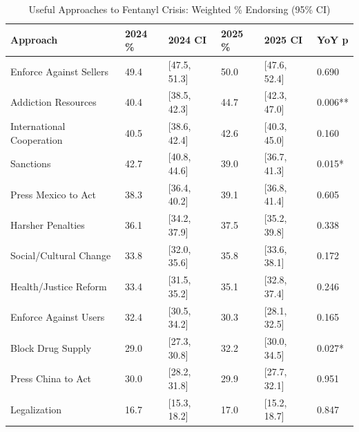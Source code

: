 \begin{table}[!h]
\centering
\caption{Useful Approaches to Fentanyl Crisis: Weighted \% Endorsing (95\% CI)}
\centering
\begin{tabular}[t]{llllll}
\toprule
Approach & 2024 \% & 2024 CI & 2025 \% & 2025 CI & YoY p\\
\midrule
Enforce Against Sellers & 49.4 & {}[47.5, 51.3] & 50.0 & {}[47.6, 52.4] & 0.690\\
Addiction Resources & 40.4 & {}[38.5, 42.3] & 44.7 & {}[42.3, 47.0] & 0.006**\\
International Cooperation & 40.5 & {}[38.6, 42.4] & 42.6 & {}[40.3, 45.0] & 0.160\\
Sanctions & 42.7 & {}[40.8, 44.6] & 39.0 & {}[36.7, 41.3] & 0.015*\\
Press Mexico to Act & 38.3 & {}[36.4, 40.2] & 39.1 & {}[36.8, 41.4] & 0.605\\
Harsher Penalties & 36.1 & {}[34.2, 37.9] & 37.5 & {}[35.2, 39.8] & 0.338\\
Social/Cultural Change & 33.8 & {}[32.0, 35.6] & 35.8 & {}[33.6, 38.1] & 0.172\\
Health/Justice Reform & 33.4 & {}[31.5, 35.2] & 35.1 & {}[32.8, 37.4] & 0.246\\
Enforce Against Users & 32.4 & {}[30.5, 34.2] & 30.3 & {}[28.1, 32.5] & 0.165\\
Block Drug Supply & 29.0 & {}[27.3, 30.8] & 32.2 & {}[30.0, 34.5] & 0.027*\\
Press China to Act & 30.0 & {}[28.2, 31.8] & 29.9 & {}[27.7, 32.1] & 0.951\\
Legalization & 16.7 & {}[15.3, 18.2] & 17.0 & {}[15.2, 18.7] & 0.847\\
\bottomrule
\end{tabular}
\end{table}
